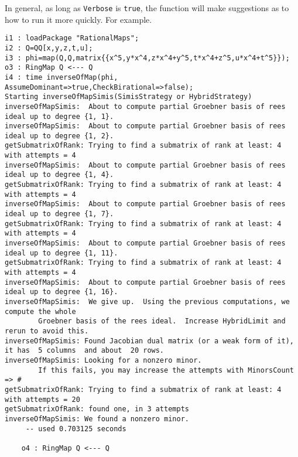 \documentclass[11pt]{amsart}
\numberwithin{equation}{theorem}
\renewcommand{\:}{\colon}
\theoremstyle{theorem}
\begin{document}
 In general, as long as {\tt Verbose} is {\tt true}, the function will make suggestions as to how to run it more quickly.  For example.
{
{\scriptsize\color{blue}
\begin{verbatim}
i1 : loadPackage "RationalMaps";
i2 : Q=QQ[x,y,z,t,u];
i3 : phi=map(Q,Q,matrix{{x^5,y*x^4,z*x^4+y^5,t*x^4+z^5,u*x^4+t^5}});
o3 : RingMap Q <--- Q
i4 : time inverseOfMap(phi, AssumeDominant=>true,CheckBirational=>false);
Starting inverseOfMapSimis(SimisStrategy or HybridStrategy)
inverseOfMapSimis:  About to compute partial Groebner basis of rees ideal up to degree {1, 1}.
inverseOfMapSimis:  About to compute partial Groebner basis of rees ideal up to degree {1, 2}.
getSubmatrixOfRank: Trying to find a submatrix of rank at least: 4 with attempts = 4
inverseOfMapSimis:  About to compute partial Groebner basis of rees ideal up to degree {1, 4}.
getSubmatrixOfRank: Trying to find a submatrix of rank at least: 4 with attempts = 4
inverseOfMapSimis:  About to compute partial Groebner basis of rees ideal up to degree {1, 7}.
getSubmatrixOfRank: Trying to find a submatrix of rank at least: 4 with attempts = 4
inverseOfMapSimis:  About to compute partial Groebner basis of rees ideal up to degree {1, 11}.
getSubmatrixOfRank: Trying to find a submatrix of rank at least: 4 with attempts = 4
inverseOfMapSimis:  About to compute partial Groebner basis of rees ideal up to degree {1, 16}.
inverseOfMapSimis:  We give up.  Using the previous computations, we compute the whole 
        Groebner basis of the rees ideal.  Increase HybridLimit and rerun to avoid this.
inverseOfMapSimis: Found Jacobian dual matrix (or a weak form of it), it has  5 columns  and about  20 rows.
inverseOfMapSimis: Looking for a nonzero minor.
        If this fails, you may increase the attempts with MinorsCount => #
getSubmatrixOfRank: Trying to find a submatrix of rank at least: 4 with attempts = 20
getSubmatrixOfRank: found one, in 3 attempts
inverseOfMapSimis: We found a nonzero minor.
     -- used 0.703125 seconds

    o4 : RingMap Q <--- Q\end{verbatim}
}}
\end{document}
